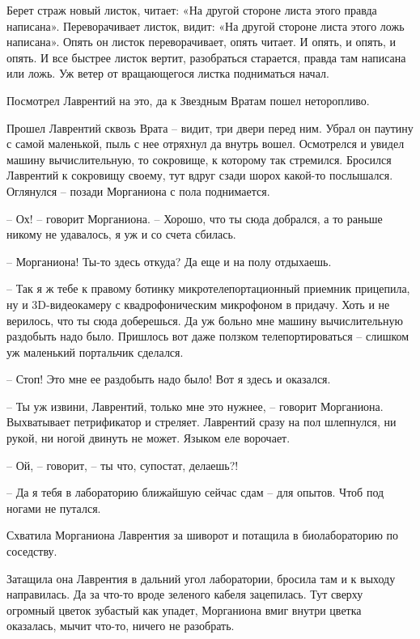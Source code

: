 \documentclass[ebook,oneside,final,openright]{memoir}
\begin{document}
\par
Берет страж новый листок, читает: «На другой стороне листа этого правда написана». Переворачивает листок, видит: «На другой стороне листа этого ложь написана». Опять он листок переворачивает, опять читает. И опять, и опять, и опять. И все быстрее листок вертит, разобраться старается, правда там написана или ложь. Уж ветер от вращающегося листка подниматься начал. \par
\par
Посмотрел Лаврентий на это, да к Звездным Вратам пошел неторопливо.\par
\par
\par
Прошел Лаврентий сквозь Врата – видит, три двери перед ним. Убрал он паутину с самой маленькой, пыль с нее отряхнул да внутрь вошел. Осмотрелся и увидел машину вычислительную, то сокровище, к которому так стремился. Бросился Лаврентий к сокровищу своему, тут вдруг сзади шорох какой-то послышался. Оглянулся – позади Морганиона с пола поднимается.\par
– Ох! – говорит Морганиона. – Хорошо, что ты сюда добрался, а то раньше никому не удавалось, я уж и со счета сбилась.\par
– Морганиона! Ты-то здесь откуда? Да еще и на полу отдыхаешь.\par
– Так я ж тебе к правому ботинку микротелепортационный приемник прицепила, ну и 3D-видеокамеру с квадрофоническим микрофоном в придачу. Хоть и не верилось, что ты сюда доберешься. Да уж больно мне машину вычислительную раздобыть надо было. Пришлось вот даже ползком телепортироваться – слишком уж маленький портальчик сделался.\par
– Стоп! Это мне ее раздобыть надо было! Вот я здесь и оказался.\par
– Ты уж извини, Лаврентий, только мне это нужнее, – говорит Морганиона. Выхватывает петрификатор и стреляет. Лаврентий сразу на пол шлепнулся, ни рукой, ни ногой двинуть не может. Языком еле ворочает.\par
– Ой, – говорит, – ты что, супостат, делаешь?!\par
– Да я тебя в лабораторию ближайшую сейчас сдам – для опытов. Чтоб под ногами не путался.\par
Схватила Морганиона Лаврентия за шиворот и потащила в биолабораторию по соседству.\par
\par
Затащила она Лаврентия в дальний угол лаборатории, бросила там и к выходу направилась. Да за что-то вроде зеленого кабеля зацепилась. Тут сверху огромный цветок зубастый как упадет, Морганиона вмиг внутри цветка оказалась, мычит что-то, ничего не разобрать.\par
\end{document}
